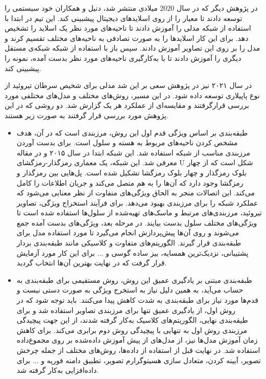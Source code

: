 در پژوهش دیگر \cite{elliott2020application} که در سال 2020 میلادی منتشر شد، دنیل و همکاران خود سیستمی را توسعه دادند تا معیار  را از روی اسلاید‌های دیجیتال پیشبینی کند. این تیم در ابتدا با استفاده از شبکه  مدلی را آموزش دادند تا ناحیه‌های مورد نظر یک اسلاید را تشخیص دهد. برای این کار اسلایدها را به صورت تصادفی به ناحیه‌های مختلف تقسیم کرند و مدل را بر روی این تصاویر آموزش دادند.
سپس باز با استفاده از شبکه  شبکه‌ی مستقل دیگری را آموزش دادند تا با به‌کارگیری ناحیه‌های مورد نظر بدست آمده،  نمونه را پیشبینی کند.



در سال ۲۰۲۱ نیز در پژوهش \cite{bohland2021machine} سعی بر این شد مدلی برای شخیص سرطان تیروئید از نوع پاپیلاری توسعه داده شود.
در این مسیر، روش‌های مختلف و مدل‌های مختلفی مورد بررسی قرارگرفتند و مقایسه‌ای از عملکرد هر یک گزارش شد.
دو روشی که در این پژوهش مورد بررسی قرار گرفتند به صورت زیر هستند.
\begin{itemize}
    \item طبقه‌بندی بر اساس ویژگی\newline
    قدم اول این روش، مرزبندی است که در آن، هدف مشخص کردن ناحیه‌های مربوط به هسته و سلول است.
    برای بدست آوردن مرزبندی مناسب از شبکه  استفاده شد. این شبکه ابتدا در سال ۲۰۱۵ و در مقاله \cite{ronneberger2015u} معرفی شد.
    این شبکه، یک معماری رمزگذار-رمزگشای U شکل است که از چهار بلوک رمزگذار و چهار بلوک رمزگشا تشکیل شده است.
    پل‌هایی بین رمزگذار و رمزگشا وجود دارد که آن‌ها را به هم متصل می‌کند و جریان اطلاعات را کامل می‌کند.
    این اتصالات منجر به الحاق ویژگی‌های متفاوت از نظر معنایی می‌شود که عملکرد شبکه را برای مرزبندی بهبود می‌دهد.
    برای فرآیند استخراج ویژگی، تصاویر تیروئید، مرزبندی‌های مرتبط و ماسک‌های تهیه‌شده از سلول‌ها استفاده شده است تا ویژگی‌های مختلف سلول بدست بیایند.
    در مرحله بعد، ویژگی‌های بدست آمده جمع می‌شوند و روی آن‌ها پیش‌پردازش انجام می‌گیرد تا مورد استفاده مدل برای طبقه‌بندی قرار گیرند. الگوریتم‌های متفاوت و کلاسیکی مانند طبقه‌بندی بردار پشتیبانی، نزدیک‌ترین همسایه، بیز ساده گوسی و ... برای این کار مورد آزمایش قرار گرفت که در نهایت بهترین آن‌ها انتخاب گردید.

    \item طبقه‌بندی مبتنی بر یادگیری عمیق\newline
    این روش، روش مستقیمی برای طبقه‌بندی به حساب می‌آید، به همین دلیل نیاز به استخرج ویژگی به صورت دستی نیست و قدم‌ها مورد نیاز برای طبقه‌بندی به شدت کاهش پیدا می‌کنند.
    باید توجه شود که در روش اول، از یادگیری عمیق تنها برای مرزبندی تصاویر استفاده شد و برای طیقه‌بندی نهایی، الگوریتم‌های کلاسیک به‌کار گرفته شدند، از این جهت پیچیدگی مرزبندی روش اول به تنهایی با پیچیدگی روش دوم برابری می‌کند.
    برای کاهش زمان آموزش مدل‌ها نیز، از مدل‌های از پیش آموزش داده‌شده بر روی مجموع‌داده \cite{deng2009imagenet} استفاده شد. در نهایت قبل از استفاده از داده‌ها، روش‌های مختلف از جمله چرخش تصویر، آیینه کردن، متعادل سازی هسیتوگرارم تصویر، تطبیق دامنه فوریه و ... برای داده‌افزایی به‌کار گرفته شد.
     

\end{itemize}
